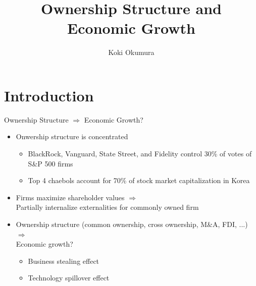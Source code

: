 \documentclass[
  10pt,               %
  aspectratio=169,    %
]{beamer}
\title{Ownership Structure and Economic Growth}
\author{Koki Okumura}
\institute{UCLA}
\date{}
\theoremstyle{plain}
\begin{document}
\begin{frame}
  \titlepage
\end{frame}

\section{Introduction}

\begin{frame}{Ownership Structure $\Longrightarrow$ Economic Growth?}
  \label{intro} %
  \begin{itemize}
    \item Onwership structure is concentrated \hfill \hyperlink{share}{}
  \begin{itemize}
    \item BlackRock, Vanguard, State Street, and Fidelity control 30\% of votes
          of S\&P 500 firms
    \item Top 4 chaebols account for 70\% of stock market capitalization in Korea
  \end{itemize}
    \medskip{} \pause
    \item Firms maximize shareholder values $\Longrightarrow$ \\
          Partially internalize externalities for commonly owned firm
    \medskip{} \pause
    \item Ownership structure (common ownership, cross ownership, M\&A, FDI, ...) $\Longrightarrow$ \\
          Economic growth?
          \begin{itemize}
            \item Business stealing effect
            \item Technology spillover effect
          \end{itemize}
  \end{itemize}
\end{frame}
\end{document}
